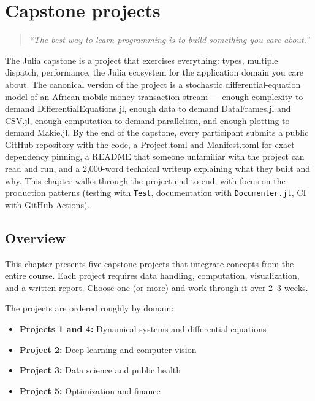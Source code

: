 \chapter{Capstone projects}
\label{ch:capstone}

\begin{quote}
\emph{``The best way to learn programming is to build something you care about.''}
\end{quote}

The Julia capstone is a project that exercises everything: types, multiple dispatch, performance, the Julia ecosystem for the application domain you care about. The canonical version of the project is a stochastic differential-equation model of an African mobile-money transaction stream --- enough complexity to demand DifferentialEquations.jl, enough data to demand DataFrames.jl and CSV.jl, enough computation to demand parallelism, and enough plotting to demand Makie.jl. By the end of the capstone, every participant submits a public GitHub repository with the code, a Project.toml and Manifest.toml for exact dependency pinning, a README that someone unfamiliar with the project can read and run, and a 2{,}000-word technical writeup explaining what they built and why. This chapter walks through the project end to end, with focus on the production patterns (testing with \texttt{Test}, documentation with \texttt{Documenter.jl}, CI with GitHub Actions).

\section{Overview}

This chapter presents five capstone projects that integrate concepts from the entire course. Each project requires data handling, computation, visualization, and a written report. Choose one (or more) and work through it over 2--3 weeks.

The projects are ordered roughly by domain:
\begin{itemize}
  \item \textbf{Projects 1 and 4:} Dynamical systems and differential equations
  \item \textbf{Project 2:} Deep learning and computer vision
  \item \textbf{Project 3:} Data science and public health
  \item \textbf{Project 5:} Optimization and finance
\end{itemize}

